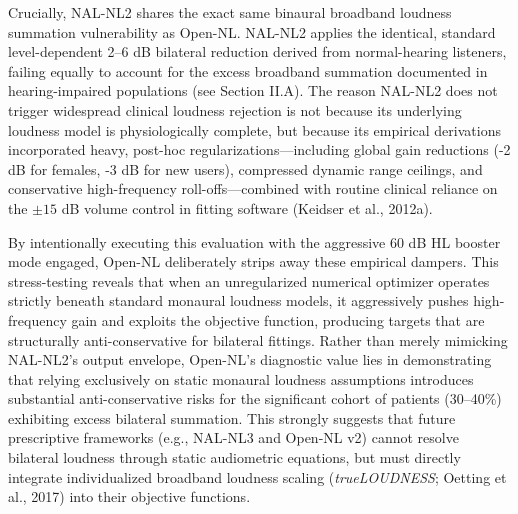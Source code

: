 \documentclass[
  12pt,
]{article}
\begin{document}
Crucially, NAL-NL2 shares the exact same binaural broadband loudness
summation vulnerability as Open-NL. NAL-NL2 applies the identical,
standard level-dependent 2--6 dB bilateral reduction derived from
normal-hearing listeners, failing equally to account for the excess
broadband summation documented in hearing-impaired populations (see
Section II.A). The reason NAL-NL2 does not trigger widespread clinical
loudness rejection is not because its underlying loudness model is
physiologically complete, but because its empirical derivations
incorporated heavy, post-hoc regularizations---including global gain
reductions (-2 dB for females, -3 dB for new users), compressed dynamic
range ceilings, and conservative high-frequency roll-offs---combined
with routine clinical reliance on the \(\pm 15\) dB volume control in
fitting software (Keidser et al., 2012a).

By intentionally executing this evaluation with the aggressive 60 dB HL
booster mode engaged, Open-NL deliberately strips away these empirical
dampers. This stress-testing reveals that when an unregularized
numerical optimizer operates strictly beneath standard monaural loudness
models, it aggressively pushes high-frequency gain and exploits the
objective function, producing targets that are structurally
anti-conservative for bilateral fittings. Rather than merely mimicking
NAL-NL2's output envelope, Open-NL's diagnostic value lies in
demonstrating that relying exclusively on static monaural loudness
assumptions introduces substantial anti-conservative risks for the
significant cohort of patients (30--40\%) exhibiting excess bilateral
summation. This strongly suggests that future prescriptive frameworks
(e.g., NAL-NL3 and Open-NL v2) cannot resolve bilateral loudness through
static audiometric equations, but must directly integrate individualized
broadband loudness scaling (\emph{trueLOUDNESS}; Oetting et al., 2017)
into their objective functions.
\end{document}
